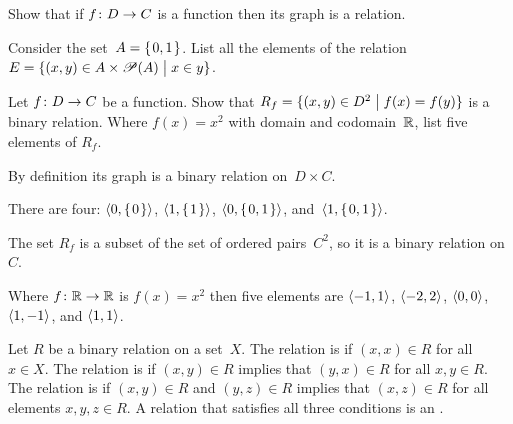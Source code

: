 \documentclass{ibl}  %
\begin{document}
\begin{ex}
\begin{exes}
\item Show that if $\mbox{$f\colon D\to C$}$ is a function then 
  its graph is a relation.
\item
  Consider the set~$A=\mbox{$\{\hspace{0.1em}0,1\hspace{0.1em}\}$}$.
  List all the elements of the relation 
  $E=\{(x,y)\in A\times\mathscr{P}(A) \bigm| x\in y\}$.
\item Let $\mbox{$f\colon D\to C$}$ be a function.
  Show that 
  $R_f=\{(x,y)\in D^2 \bigm| f(x)=f(y)\}$
  is a binary relation.
  Where $f(x)=x^2$ with domain and codomain~$\mathbb{R}$,
  list five elements of $R_f$. 
\end{exes}
\begin{ans}
\begin{exes}
\item By definition its graph is a binary relation on~$D\times C$.
\item There are four: $\langle0,\mbox{$\{\hspace{0.1em}0\hspace{0.1em}\}$}\rangle$, 
  $\langle1,\mbox{$\{\hspace{0.1em}1\hspace{0.1em}\}$}\rangle$, $\langle0,\mbox{$\{\hspace{0.1em}0,1\hspace{0.1em}\}$}\rangle$, 
  and~$\langle1,\mbox{$\{\hspace{0.1em}0,1\hspace{0.1em}\}$}\rangle$. 
\item The set $R_f$ is a subset of the set of ordered pairs~$C^2$,
  so it is a binary relation on~$C$.

  Where $\mbox{$f\colon \mathbb{R}\to \mathbb{R}$}$ is $f(x)=x^2$ then five elements are
  $\langle-1,1\rangle$, $\langle-2,2\rangle$, $\langle0,0\rangle$,
  $\langle1,-1\rangle$, and $\langle1,1\rangle$.
\end{exes}
\end{ans}
\end{ex}

\begin{df} 
Let $R$ be a binary relation on a set~$X$.
The relation is  if $(x,x)\in R$ for all $x\in X$.
The relation is  if $(x,y)\in R$ implies that
$(y,x)\in R$ for all $x,y\in R$.
The relation is  if 
$(x,y)\in R$ and $(y,z)\in R$ implies that 
$(x,z)\in R$ for all elements $x,y,z\in R$.
A relation that satisfies all three conditions is an
.  
\end{df}
\end{document}
